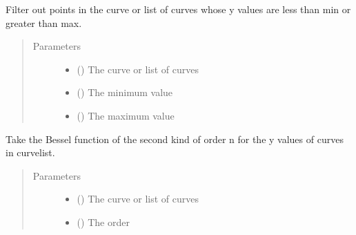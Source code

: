 \documentclass[letterpaper,10pt,english]{sphinxmanual}
\begin{document}
\begin{fulllineitems}
\label{\detokenize{pydv:pydvpy.yminmax}}
Filter out points in the curve or list of curves whose y values are
less than min or greater than max.
\begin{quote}\begin{description}
\item[{Parameters}] \leavevmode\begin{itemize}
\item {} 
 () \textendash{} The curve or list of curves

\item {} 
 () \textendash{} The minimum value

\item {} 
 () \textendash{} The maximum value

\end{itemize}

\end{description}\end{quote}

\end{fulllineitems}


\begin{fulllineitems}
\label{\detokenize{pydv:pydvpy.yn}}
Take the Bessel function of the second kind of order n for the y values of
curves in curvelist.
\begin{quote}\begin{description}
\item[{Parameters}] \leavevmode\begin{itemize}
\item {} 
 () \textendash{} The curve or list of curves

\item {} 
 () \textendash{} The order

\end{itemize}

\end{description}\end{quote}

\end{fulllineitems}
\end{document}
